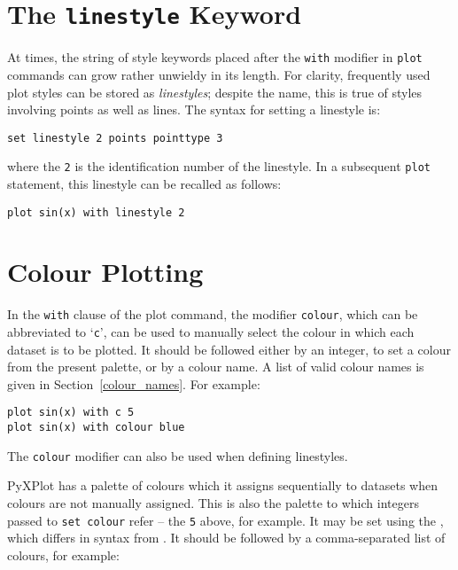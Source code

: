 \section{The {\tt linestyle} Keyword}

At times, the string of style keywords placed after the {\tt with} modifier
in {\tt plot} commands can grow rather unwieldy in its length. For clarity,
frequently used plot styles can be stored as {\it linestyles}; despite the name,
this is true of styles involving points as well as lines. The syntax for
setting a linestyle is:

\begin{verbatim}
set linestyle 2 points pointtype 3
\end{verbatim}

\noindent where the {\tt 2} is the identification number of the linestyle. In a
subsequent {\tt plot} statement, this linestyle can be recalled as follows:

\begin{verbatim}
plot sin(x) with linestyle 2
\end{verbatim}

\section{Colour Plotting}

 In the {\tt with} clause of the plot
command, the modifier {\tt colour}, which can be abbreviated to
`{\tt c}', can be used to manually select the colour in which each dataset
is to be plotted. It should be followed either by an integer, to set a colour
from the present palette, or by a colour name. A list of valid colour names is
given in Section~\ref{colour_names}. For example:

\begin{verbatim}
plot sin(x) with c 5
plot sin(x) with colour blue
\end{verbatim}

\noindent The {\tt colour} modifier can also be used when defining linestyles.

PyXPlot has a palette of colours which it assigns sequentially to datasets when
colours are not manually assigned. This is also the palette to which integers
passed to {\tt set colour} refer -- the {\tt 5} above, for example. It may be
set using the , which differs in syntax from \gnuplot. It
should be followed by a comma-separated list of colours, for example:

